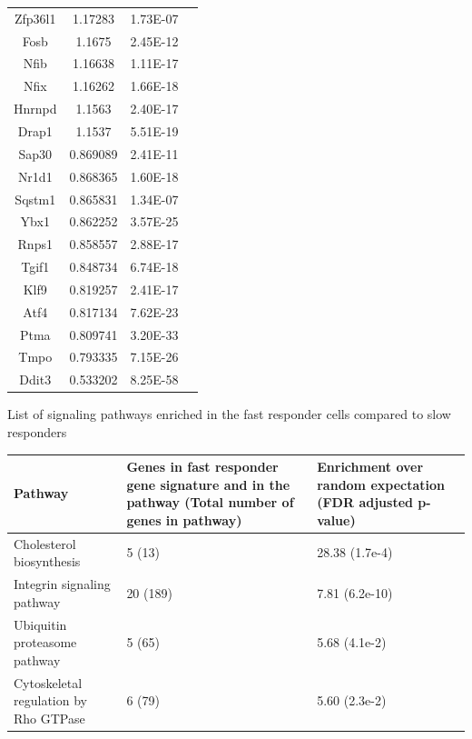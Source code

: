 \begin{supptable}[p]
\begin{tabular}{ cccc }
Zfp36l1 & 1.17283 & 1.73E-07 \\
Fosb & 1.1675 & 2.45E-12 \\
Nfib & 1.16638 & 1.11E-17 \\
Nfix & 1.16262 & 1.66E-18 \\
Hnrnpd & 1.1563 & 2.40E-17 \\
Drap1 & 1.1537 & 5.51E-19 \\
Sap30 & 0.869089 & 2.41E-11 \\
Nr1d1 & 0.868365 & 1.60E-18 \\
Sqstm1 & 0.865831 & 1.34E-07 \\
Ybx1 & 0.862252 & 3.57E-25 \\
Rnps1 & 0.858557 & 2.88E-17 \\
Tgif1 & 0.848734 & 6.74E-18 \\
Klf9 & 0.819257 & 2.41E-17 \\
Atf4 & 0.817134 & 7.62E-23 \\
Ptma & 0.809741 & 3.20E-33 \\
Tmpo & 0.793335 & 7.15E-26 \\
Ddit3 & 0.533202 & 8.25E-58 \\
\bottomrule
\end{tabular}
\label{tab:hedgehog_tableS1}
\end{supptable}

\begin{supptable}[p]
\centering
\caption{List of signaling pathways enriched in the fast responder cells compared to slow responders}
\begin{tabular}{ p{3cm}p{3cm}p{3cm} }
\toprule
\textbf{Pathway} & \textbf{Genes in fast responder gene signature and in the pathway (Total number of genes in pathway)} & \textbf{Enrichment over random expectation (FDR adjusted p-value)} \\
\midrule
Cholesterol biosynthesis & 5 (13) & 28.38 (1.7e-4) \\
Integrin signaling pathway & 20 (189) & 7.81 (6.2e-10) \\
Ubiquitin proteasome pathway & 5 (65) & 5.68 (4.1e-2) \\
Cytoskeletal regulation by Rho GTPase & 6 (79) & 5.60 (2.3e-2) \\
\bottomrule
\end{tabular}
\label{tab:hedgehog_tableS2}
\end{supptable}


